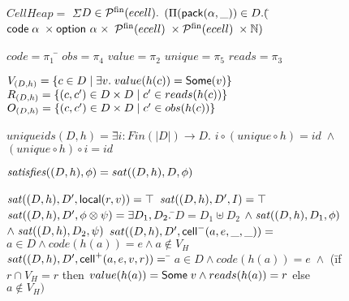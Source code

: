 \documentclass[preprint,natbib]{sigplanconf}
\begin{document}
\begin{figure}
{\small
\begin{specification}
$CellHeap =$ \nextline
\;\;$\Sigma$\=$ D \in \mathcal{P}^{\mathrm{fin}}({ecell}).$ \nextline
               \>$(\Pi (\mbox{\textsf{{pack}}}({\alpha}, {\_})) \in D. 
  ($\=${\mbox{\textsf{{code}}}\;{\alpha}} \;\times \mbox{\textsf{{option }}}{\alpha} \;\times$ \nextline
\>  \>${\mathcal{P}^{\mathrm{fin}}({ecell})} \;\times \mathcal{P}^{\mathrm{fin}}({ecell}) \;\times \mathbb{N})$ \nextline[0.5em]
       

$code = \pi_1$ \qquad\qquad\= $obs = \pi_4$ \nextline
$value = \pi_2$            \> $unique = \pi_5$ \nextline
$reads = \pi_3$ 

$V_{(D, h)} = \{{{c \in D}\;|\;{\exists v.\; value(h(c)) = \mbox{\textsf{{Some}}}(v)}}\}$ 
$R_{(D, h)} = \{{{(c,c') \in D \times D}\;|\;{ c' \in reads(h(c)) }}\}$ 
$O_{(D, h)} = \{{{(c,c') \in D \times D}\;|\;{ c' \in obs(h(c)) }}\}$ 

$\mathit{uniqueids}(D,h) = \exists$\=$i : Fin(|D|) \to D.$\nextline
                       \>$i \circ (unique \circ h) = id \; \land$ \nextline
                       \>$(unique \circ h) \circ i = id$ 

$\mathit{satisfies}({(D,h)}, {\phi}) = sat((D,h), D, \phi)$ 

$\mathit{sat}((D,h), D', \mbox{\textsf{{local}}}({r}, {v})) = \top$ 
$\mathit{sat}((D,h), D', I) = \top$ 
$\mathit{sat}((D,h), D', \phi \otimes \psi) = \exists D_1, D_2.\;$\=$D = D_1 \uplus D_2$ \nextline
                                                    \>$\land\; \mathit{sat}((D,h), D_1, \phi)$ \nextline
                                                    \>$\land\; \mathit{sat}((D,h), D_2, \psi)$ 
$sat((D,h), D', \mbox{\textsf{{cell}}}^{-}({a}, {e}, {\_}, {\_})) = $ \nextline
\qquad $a \in D \land code(h(a)) = e \land a \not \in V_H$ 
$sat((D,h), D', \mbox{\textsf{{cell}}}^{+}({a}, {e}, {v}, {r})) = $ \nextline
\qquad\= $a \in D \land code(h(a)) = e \;\land$ \nextline
      \>     (\= if $r \cap V_H = r$ \nextline
      \>     \>then $value(h(a)) = \mbox{\textsf{{Some}}}\;v \land reads(h(a)) = r$ \nextline
      \>     \>else $a \not\in V_H)$


\end{specification}}
\end{figure}
\end{document}
